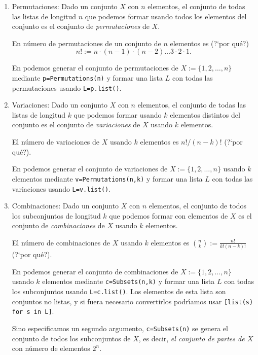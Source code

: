 \begin{enumerate}
 \item {\sc Permutaciones:} Dado un conjunto $X$ con $n$ elementos, el conjunto
de todas las listas de longitud $n$ que podemos formar usando todos  los
elementos del conjunto  es el conjunto de {\itshape permutaciones} de $X$. 

En n\'umero de permutaciones de un conjunto de $n$ elementos es (?`por qu\'e?)
\[n!:=n\cdot (n-1)\cdot (n-2)\dots 3\cdot 2\cdot 1.\]

En {\sage} podemos generar el conjunto de permutaciones de 
$X:=\{1,2,\dots,n\}$ mediante \lstinline|p=Permutations(n)| y formar una lista
$L$ con todas las permutaciones usando \lstinline|L=p.list()|. 

\item{\sc Variaciones:}  Dado un conjunto $X$ con $n$ elementos, el conjunto
de todas las listas de longitud $k$ que podemos formar usando $k$   
elementos distintos del  conjunto  es el conjunto de {\itshape variaciones} de
$X$ usando $k$ elementos.

El n\'umero de variaciones de $X$ usando $k$ elementos es $n!/(n-k)!$  (?`por
qu\'e?).
 
 En {\sage} podemos generar el conjunto de variaciones  de 
$X:=\{1,2,\dots,n\}$ usando $k$ elementos  mediante
\lstinline|v=Permutations(n,k)| y formar una lista $L$ con
todas las variaciones usando \lstinline|L=v.list()|. 
 
 \item{\sc Combinaciones:}  Dado un conjunto $X$ con $n$ elementos, el conjunto
de todos los  subconjuntos  de longitud $k$ que podemos formar con elementos de
$X$  es el conjunto de {\itshape combinaciones} de $X$ usando $k$ elementos.
 
El n\'umero de combinaciones de $X$ usando $k$ elementos es
$\binom{n}{k}:=\frac{n!}{k!(n-k)!}$  (?`por
qu\'e?).
 
 En {\sage} podemos generar el conjunto de combinaciones   de 
$X:=\{1,2,\dots,n\}$ usando $k$ elementos  mediante \lstinline|c=Subsets(n,k)|
y formar una lista $L$ con todas los subconjuntos  usando
\lstinline|L=c.list()|.  Los elementos de esta lista son conjuntos no listas, y
si fuera necesario convertirlos podr\'{\i}amos usar 
\lstinline|[list(s) for s in L]|.


Sino especificamos un segundo argumento, \lstinline|c=Subsets(n)| se genera el
conjunto de todos los subconjuntos de $X$, es decir, {\itshape el conjunto de
partes de $X$} con n\'umero de elementos $2^n.$
 
 \end{enumerate}




